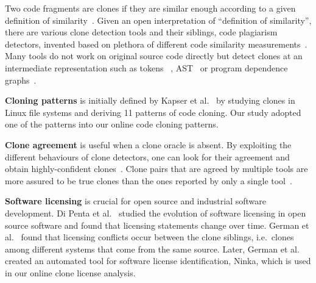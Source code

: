 \documentclass[10pt,journal,compsoc]{IEEEtran}
\begin{document}
Two code fragments are clones if they are similar enough according to
a given definition of similarity~\cite{Bellon2007}. Given an open
interpretation of ``definition of similarity'', there are various
clone detection tools and their siblings, code plagiarism detectors,
invented based on plethora of different code similarity
measurements~\cite{Roy2008, Ragkhitwetsagul2016,emse,Svajlenko2014}. 
Many tools do not work on original source code directly but detect clones
at an intermediate representation such as tokens ~\cite{Sajnani2016,Kamiya2002,Li2006,Gode2009,Burrows2007, Smith2009, Duric2012, Prechelt2002, Schleimer2003}, AST~\cite{Baxter1998,Jiang2007a} or program dependence
graphs~\cite{Krinke2001,Komondoor2001}. 

\textbf{Cloning patterns} is initially defined 
by Kapser et al.~\cite{Kapser2003,Kapser2008} by studying clones in 
Linux file systems and deriving 11 patterns of code cloning. 
Our study adopted one of the patterns into our online code cloning patterns.

\textbf{Clone agreement} is useful when a clone oracle is
absent. %
By exploiting the different behaviours of clone detectors,
one can look for their agreement and obtain
highly-confident clones~\cite{Bellon2007,Wang2013}. %
Clone pairs that are agreed by multiple tools are more assured to be true
clones than the ones reported by only a single
tool~\cite{Wang2013,cr2016ssbse,Funaro2010}. 

\textbf{Software licensing} is crucial for open source and 
industrial software development. Di Penta et al.~\cite{DiPenta2010}
studied the evolution of software licensing in open source 
software and found that licensing statements change over 
time. German et al.~\cite{German2009} found that licensing 
conflicts occur between the clone siblings, i.e.~clones among 
different systems that come from the same source. Later, 
German et al.~\cite{German2010} created an automated tool 
for software license identification, Ninka, which is used
in our online clone license analysis. 
\end{document}
